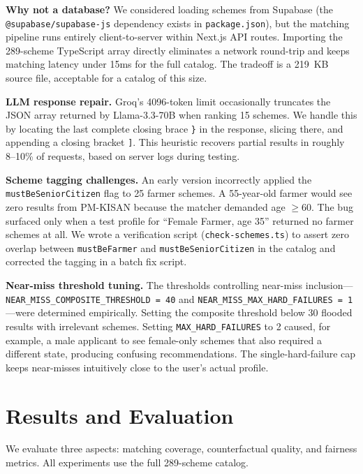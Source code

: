 \documentclass[conference]{IEEEtran}
\begin{document}
\textbf{Why not a database?} We considered loading schemes from Supabase (the \texttt{@supabase/supabase-js} dependency exists in \texttt{package.json}), but the matching pipeline runs entirely client-to-server within Next.js API routes. Importing the 289-scheme TypeScript array directly eliminates a network round-trip and keeps matching latency under 15ms for the full catalog. The tradeoff is a 219~KB source file, acceptable for a catalog of this size.

\textbf{LLM response repair.} Groq's 4096-token limit occasionally truncates the JSON array returned by Llama-3.3-70B when ranking 15 schemes. We handle this by locating the last complete closing brace \texttt{\}} in the response, slicing there, and appending a closing bracket \texttt{]}. This heuristic recovers partial results in roughly 8--10\% of requests, based on server logs during testing.

\textbf{Scheme tagging challenges.} An early version incorrectly applied the \texttt{mustBeSeniorCitizen} flag to 25 farmer schemes. A 55-year-old farmer would see zero results from PM-KISAN because the matcher demanded age $\geq 60$. The bug surfaced only when a test profile for ``Female Farmer, age 35'' returned no farmer schemes at all. We wrote a verification script (\texttt{check-schemes.ts}) to assert zero overlap between \texttt{mustBeFarmer} and \texttt{mustBeSeniorCitizen} in the catalog and corrected the tagging in a batch fix script.

\textbf{Near-miss threshold tuning.} The thresholds controlling near-miss inclusion---\texttt{NEAR\_MISS\_COMPOSITE\_THRESHOLD = 40} and \texttt{NEAR\_MISS\_MAX\_HARD\_FAILURES = 1}---were determined empirically. Setting the composite threshold below 30 flooded results with irrelevant schemes. Setting \texttt{MAX\_HARD\_FAILURES} to 2 caused, for example, a male applicant to see female-only schemes that also required a different state, producing confusing recommendations. The single-hard-failure cap keeps near-misses intuitively close to the user's actual profile.

\section{Results and Evaluation}

We evaluate three aspects: matching coverage, counterfactual quality, and fairness metrics. All experiments use the full 289-scheme catalog.
\end{document}
